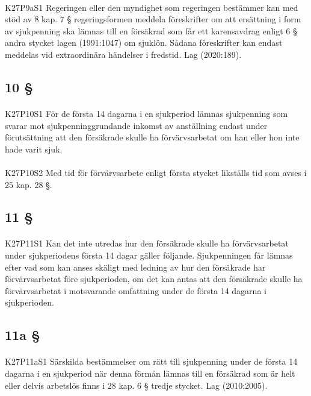 \documentclass[a4paper,notitlepage,openany,10pt]{book}
\begin{document}
\paragraph*{}
{\tiny K27P9aS1}
Regeringen eller den myndighet som regeringen bestämmer kan med stöd av 8 kap. 7 § regeringsformen meddela föreskrifter om att ersättning i form av sjukpenning ska lämnas till en försäkrad som får ett karensavdrag enligt 6 § andra stycket lagen (1991:1047) om sjuklön. Sådana föreskrifter kan endast meddelas vid extraordinära händelser i fredstid.
Lag (2020:189).
\subsection*{10 §}
\paragraph*{}
{\tiny K27P10S1}
För de första 14 dagarna i en sjukperiod lämnas sjukpenning som svarar mot sjukpenninggrundande inkomst av anställning endast under förutsättning att den försäkrade skulle ha förvärvsarbetat om han eller hon inte hade varit sjuk.
\paragraph*{}
{\tiny K27P10S2}
Med tid för förvärvsarbete enligt första stycket likställs tid som avses i 25 kap. 28 §.
\subsection*{11 §}
\paragraph*{}
{\tiny K27P11S1}
Kan det inte utredas hur den försäkrade skulle ha förvärvsarbetat under sjukperiodens första 14 dagar gäller följande. Sjukpenningen får lämnas efter vad som kan anses skäligt med ledning av hur den försäkrade har förvärvsarbetat före sjukperioden, om det kan antas att den försäkrade skulle ha förvärvsarbetat i motsvarande omfattning under de första 14 dagarna i sjukperioden.
\subsection*{11a §}
\paragraph*{}
{\tiny K27P11aS1}
Särskilda bestämmelser om rätt till sjukpenning under de första 14 dagarna i en sjukperiod när denna förmån lämnas till en försäkrad som är helt eller delvis arbetslös finns i 28 kap. 6 § tredje stycket.
Lag (2010:2005).
\end{document}

